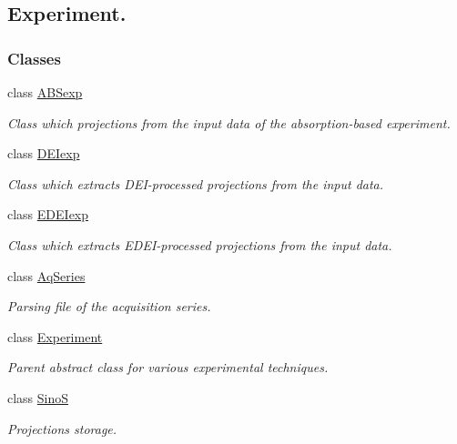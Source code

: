 \hypertarget{group__experiment}{
\subsection{Experiment.}
\label{group__experiment}
}
\subsubsection*{Classes}
\begin{DoxyCompactItemize}
\item 
class \hyperlink{classABSexp}{ABSexp}
\begin{DoxyCompactList}\small\item\em Class which projections from the input data of the absorption-\/based experiment. \item\end{DoxyCompactList}\item 
class \hyperlink{classDEIexp}{DEIexp}
\begin{DoxyCompactList}\small\item\em Class which extracts DEI-\/processed projections from the input data. \item\end{DoxyCompactList}\item 
class \hyperlink{classEDEIexp}{EDEIexp}
\begin{DoxyCompactList}\small\item\em Class which extracts EDEI-\/processed projections from the input data. \item\end{DoxyCompactList}\item 
class \hyperlink{classAqSeries}{AqSeries}
\begin{DoxyCompactList}\small\item\em Parsing file of the acquisition series. \item\end{DoxyCompactList}\item 
class \hyperlink{classExperiment}{Experiment}
\begin{DoxyCompactList}\small\item\em Parent abstract class for various experimental techniques. \item\end{DoxyCompactList}\item 
class \hyperlink{classSinoS}{SinoS}
\begin{DoxyCompactList}\small\item\em Projections storage. \item\end{DoxyCompactList}\item 

\end{DoxyCompactItemize}
